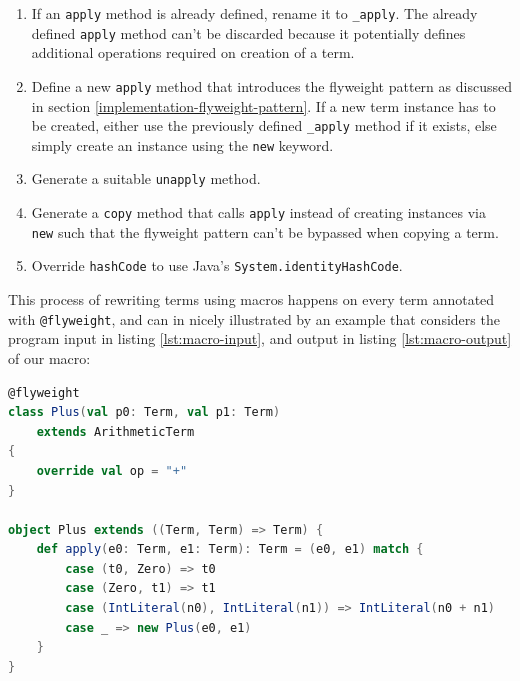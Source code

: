 \documentclass[11pt]{article}
\begin{document}
    \begin{enumerate}
        \item If an \texttt{apply} method is already defined, rename it to \texttt{\_apply}.
            The already defined \texttt{apply} method can't be discarded because it potentially
            defines additional operations required on creation of a term.
        \item Define a new \texttt{apply} method that introduces the flyweight pattern
            as discussed in section \ref{implementation-flyweight-pattern}.
            If a new term instance has to be created, either use  the previously 
            defined \texttt{\_apply} method
            if it exists, else simply create an instance using the \texttt{new} keyword.
        \item Generate a suitable \texttt{unapply} method.
        \item Generate a \texttt{copy} method that calls \texttt{apply} instead of creating
            instances via \texttt{new} such that the flyweight pattern can't be bypassed
            when copying a term.
        \item Override \texttt{hashCode} to use Java's \texttt{System.identityHashCode}.
    \end{enumerate}

    This process of rewriting terms using macros happens on every term
    annotated with \texttt{@flyweight}, and can in nicely illustrated by an example
    that considers the program input in listing \ref{lst:macro-input}, and output in listing \ref{lst:macro-output} of our macro:

    \begin{lstlisting}[language=Scala, caption={Input code annotated with the macro.}, label={lst:macro-input}]
@flyweight
class Plus(val p0: Term, val p1: Term)
    extends ArithmeticTerm
{
    override val op = "+"
}

object Plus extends ((Term, Term) => Term) {
    def apply(e0: Term, e1: Term): Term = (e0, e1) match {
        case (t0, Zero) => t0
        case (Zero, t1) => t1
        case (IntLiteral(n0), IntLiteral(n1)) => IntLiteral(n0 + n1)
        case _ => new Plus(e0, e1)
    }
}        
    \end{lstlisting}
\end{document}
